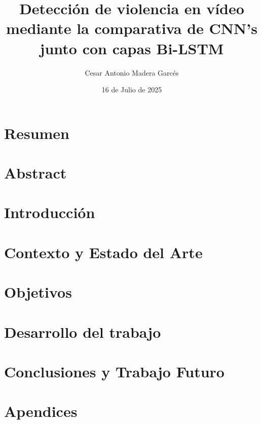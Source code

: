 \documentclass[11pt,a4paper,spanish]{book}
\title{Detección de violencia en vídeo mediante la comparativa de CNN's junto con capas Bi-LSTM}
\author{Cesar Antonio Madera Garcés}
\date{16 de Julio de 2025}
\numberwithin{equation}{chapter}
\numberwithin{figure}{chapter}
\begin{document}
\renewcommand{\listfigurename}{Índice de Ilustraciones}
\renewcommand{\listtablename}{Índice de Tablas}
\renewcommand{\contentsname}{Índice de Contenidos}
\renewcommand{\figurename}{Figura}
\renewcommand{\tablename}{Tabla} 

\maketitle

\frontmatter
\tableofcontents
\listoffigures
\listoftables

\chapter{Resumen}


\chapter{Abstract}


\mainmatter
\chapter{Introducción}



\chapter{Contexto y Estado del Arte}


\chapter{Objetivos}


\chapter{Desarrollo del trabajo}


\chapter{Conclusiones y Trabajo Futuro}


\newpage


\appendix
\chapter{Apendices}
\end{document}
